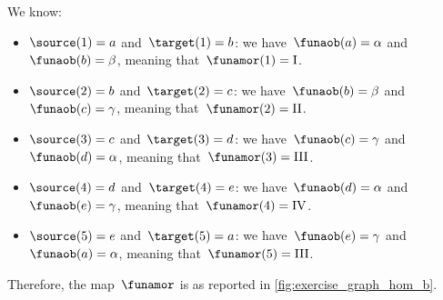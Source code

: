 \begin{solution}
    We know:
    \begin{itemize}
        \item $\source(1)=a$ and~$\target(1)=b$: we have~$\funaob(a)=\alpha$ and~$\funaob(b)=\beta$, meaning that~$\funamor(1)=\text{I}$.
        \item $\source(2)=b$ and~$\target(2)=c$: we have~$\funaob(b)=\beta$ and~$\funaob(c)=\gamma$, meaning that~$\funamor(2)=\text{II}$.
        \item $\source(3)=c$ and~$\target(3)=d$: we have~$\funaob(c)=\gamma$ and~$\funaob(d)=\alpha$, meaning that~$\funamor(3)=\text{III}$.
        \item $\source(4)=d$ and~$\target(4)=e$: we have~$\funaob(d)=\alpha$ and~$\funaob(e)=\gamma$, meaning that~$\funamor(4)=\text{IV}$.
        \item $\source(5)=e$ and~$\target(5)=a$: we have~$\funaob(e)=\gamma$ and~$\funaob(a)=\alpha$, meaning that~$\funamor(5)=\text{III}$.
    \end{itemize}
    Therefore, the map~$\funamor$ is as reported in \cref{fig:exercise_graph_hom_b}.

    \begin{marginfigure}
        \centering
        \caption{}
        \label{fig:exercise_graph_hom_b}
    \end{marginfigure}
\end{solution}

